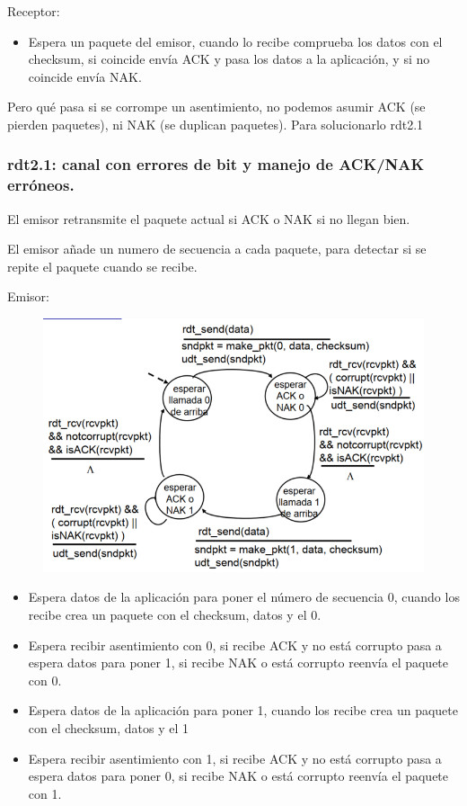 \documentclass[12pt, twoside, openright]{report} %
\begin{document}
	  Receptor:

      \begin{itemize}
      \item
        Espera un paquete del emisor, cuando lo recibe comprueba los
        datos con el checksum, si coincide envía ACK y pasa los datos a
        la aplicación, y si no coincide envía NAK.
      \end{itemize}

	  Pero qué pasa si se corrompe un asentimiento, no podemos asumir
      ACK (se pierden paquetes), ni NAK (se duplican paquetes). Para
      solucionarlo rdt2.1
\pagebreak
\subsubsection{rdt2.1: canal con errores de bit y manejo de ACK/NAK erróneos.}


      El emisor retransmite el paquete actual si ACK o NAK si no llegan
      bien.

	  El emisor añade un numero de secuencia a cada paquete, para
      detectar si se repite el paquete cuando se recibe.

	  Emisor:
	  \begin{figure}[H]
		{\includegraphics[scale=.45]{Untitled 12.png}}
	\end{figure}
      \begin{itemize}
      \item
        Espera datos de la aplicación para poner el número de secuencia
        0, cuando los recibe crea un paquete con el checksum, datos y el
        0.
      \item
        Espera recibir asentimiento con 0, si recibe ACK y no está
        corrupto pasa a espera datos para poner 1, si recibe NAK o está
        corrupto reenvía el paquete con 0.
      \item
        Espera datos de la aplicación para poner 1, cuando los recibe
        crea un paquete con el checksum, datos y el 1
      \item
        Espera recibir asentimiento con 1, si recibe ACK y no está
        corrupto pasa a espera datos para poner 0, si recibe NAK o está
        corrupto reenvía el paquete con 1.
      \end{itemize}
\end{document}
